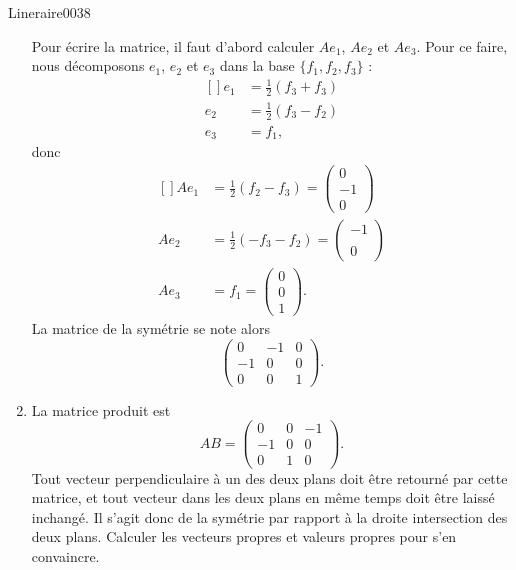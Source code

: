 \begin{corrige}{Lineraire0038}
\begin{enumerate}
		Pour écrire la matrice, il faut d'abord calculer $Ae_1$, $Ae_2$ et $Ae_3$. Pour ce faire, nous décomposons $e_1$, $e_2$ et $e_3$ dans la base $\{ f_1,f_2,f_3 \}$ :
		\begin{equation}
			\begin{aligned}[]
				e_1&=\frac{ 1 }{2}(f_3+f_3)\\
				e_2&=\frac{ 1 }{2}(f_3-f_2)\\
				e_3&=f_1,
			\end{aligned}
		\end{equation}
		donc
		\begin{equation}
			\begin{aligned}[]
				Ae_1&=\frac{1 }{2}(f_2-f_3)=\begin{pmatrix}
					0	\\ 
					-1	\\ 
					0	
				\end{pmatrix}\\
				Ae_2&=\frac{1 }{2}(-f_3-f_2)=\begin{pmatrix}
					-1	\\ 
					\	\\ 
					0	
				\end{pmatrix}\\
				Ae_3&=f_1=\begin{pmatrix}
					0	\\ 
					0	\\ 
					1	
				\end{pmatrix}.
			\end{aligned}
		\end{equation}
		La matrice de la symétrie se note alors
		\begin{equation}
			\begin{pmatrix}
				0	&	-1	&	0	\\
				-1	&	0	&	0	\\
				0	&	0	&	1
			\end{pmatrix}.
		\end{equation}
		

	\item
		La matrice produit est
		\begin{equation}
			AB=\begin{pmatrix}
				0	&	0	&	-1	\\
				-1	&	0	&	0	\\
				0	&	1	&	0
			\end{pmatrix}.
		\end{equation}
		Tout vecteur perpendiculaire à un des deux plans doit être retourné par cette matrice, et tout vecteur dans les deux plans en même temps doit être laissé inchangé. Il s'agit donc de la symétrie par rapport à la droite intersection des deux plans. Calculer les vecteurs propres et valeurs propres pour s'en convaincre.
	
	\end{enumerate}

\end{corrige}
